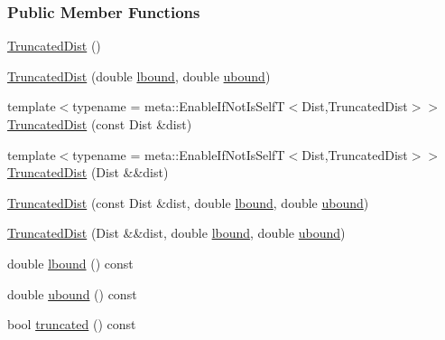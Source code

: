\subsubsection*{Public Member Functions}
\begin{DoxyCompactItemize}
\item 
\hyperlink{classprior__hessian_1_1TruncatedDist_ae765f6a934baf4d9f4f2a4734673be68}{Truncated\+Dist} ()
\item 
\hyperlink{classprior__hessian_1_1TruncatedDist_a79ff97eb5315095d9e1f590285994b4d}{Truncated\+Dist} (double \hyperlink{classprior__hessian_1_1TruncatedDist_a9e67788ba67e88cedc65f5166f6448ce}{lbound}, double \hyperlink{classprior__hessian_1_1TruncatedDist_a46cba73068eff4d100e8184deebb8016}{ubound})
\item 
{\footnotesize template$<$typename  = meta\+::\+Enable\+If\+Not\+Is\+Self\+T$<$\+Dist,\+Truncated\+Dist$>$$>$ }\\\hyperlink{classprior__hessian_1_1TruncatedDist_a34fa3f2d54eca9cd14b3c22a2e9e453f}{Truncated\+Dist} (const Dist \&dist)
\item 
{\footnotesize template$<$typename  = meta\+::\+Enable\+If\+Not\+Is\+Self\+T$<$\+Dist,\+Truncated\+Dist$>$$>$ }\\\hyperlink{classprior__hessian_1_1TruncatedDist_abc492fe91f607f26ca83fa39336f6ad7}{Truncated\+Dist} (Dist \&\&dist)
\item 
\hyperlink{classprior__hessian_1_1TruncatedDist_a645357d7c21e4aaa39764ca122b1f7c4}{Truncated\+Dist} (const Dist \&dist, double \hyperlink{classprior__hessian_1_1TruncatedDist_a9e67788ba67e88cedc65f5166f6448ce}{lbound}, double \hyperlink{classprior__hessian_1_1TruncatedDist_a46cba73068eff4d100e8184deebb8016}{ubound})
\item 
\hyperlink{classprior__hessian_1_1TruncatedDist_a2216e9f40666f527fdda87486e4782e8}{Truncated\+Dist} (Dist \&\&dist, double \hyperlink{classprior__hessian_1_1TruncatedDist_a9e67788ba67e88cedc65f5166f6448ce}{lbound}, double \hyperlink{classprior__hessian_1_1TruncatedDist_a46cba73068eff4d100e8184deebb8016}{ubound})
\item 
double \hyperlink{classprior__hessian_1_1TruncatedDist_a9e67788ba67e88cedc65f5166f6448ce}{lbound} () const 
\item 
double \hyperlink{classprior__hessian_1_1TruncatedDist_a46cba73068eff4d100e8184deebb8016}{ubound} () const 
\item 
bool \hyperlink{classprior__hessian_1_1TruncatedDist_a255e94539840457c405d2621849c2635}{truncated} () const 
\item 

\end{DoxyCompactItemize}
